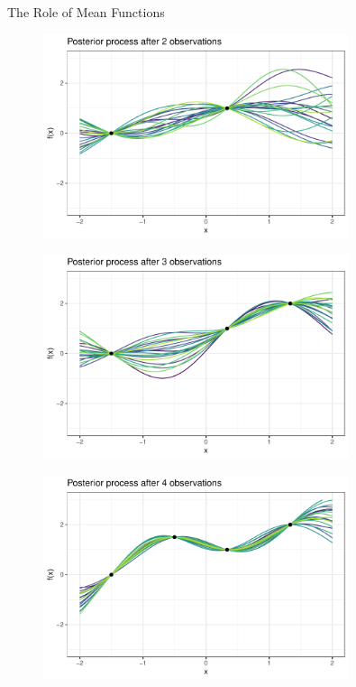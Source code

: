 \documentclass[11pt,compress,t,notes=noshow, xcolor=table]{beamer}
\begin{document}
\begin{vbframe}{The Role of Mean Functions}
\begin{itemize}
\framebreak
 


\begin{figure}
\includegraphics[width=0.8\textwidth]{figure/gp_sample/2_2.pdf}
\end{figure}

 \framebreak
 
 
\begin{figure}
\includegraphics[width=0.8\textwidth]{figure/gp_sample/2_3.pdf}
\end{figure}

\framebreak

\begin{figure}
\includegraphics[width=0.8\textwidth]{figure/gp_sample/2_4.pdf}
\end{figure}


\end{itemize}
\end{vbframe}
\end{document}
